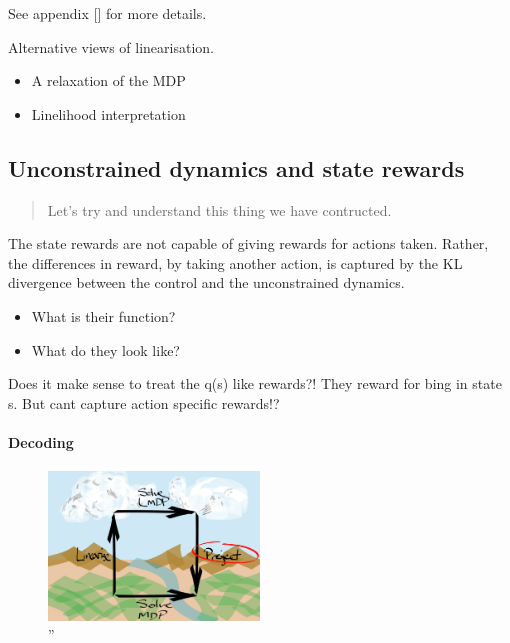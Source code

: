 See appendix {[}{]} for more details.

Alternative views of linearisation.

\begin{itemize}
\tightlist
\item
  A relaxation of the MDP
\item
  Linelihood interpretation
\end{itemize}

\hypertarget{unconstrained-dynamics-and-state-rewards}{%
\subsection{Unconstrained dynamics and state
rewards}\label{unconstrained-dynamics-and-state-rewards}}

\begin{quote}
Let's try and understand this thing we have contructed.
\end{quote}

The state rewards are not capable of giving rewards for actions taken.
Rather, the differences in reward, by taking another action, is captured
by the KL divergence between the control and the unconstrained dynamics.

\begin{itemize}
\tightlist
\item
  What is their function?
\item
  What do they look like?
\end{itemize}

Does it make sense to treat the q(s) like rewards?! They reward for bing
in state s. But cant capture action specific rewards!?

\hypertarget{decoding}{%
\paragraph{Decoding}\label{decoding}}

\begin{figure}
\centering
\includegraphics[width=0.5\textwidth,height=0.5\textheight]{../../pictures/drawings/abstract-representations-project.png}
\caption{''}
\end{figure}


